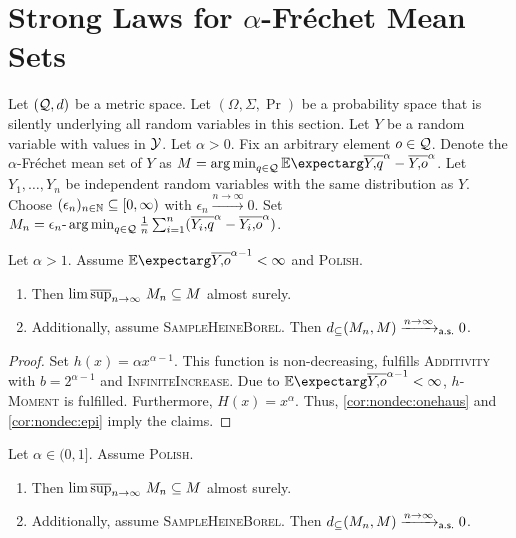 %
\section{Strong Laws for $\alpha$-Fréchet Mean Sets}\label{sec:power}
%
Let $(\mathcal{Q}, d)$ be a metric space. Let $(\Omega, \Sigma, \Pr)$ be a probability space that is silently underlying all random variables in this section. Let $Y$ be a random variable with values in $\mathcal{Y}$.
Let $\alpha > 0$. Fix an arbitrary element $o\in\mathcal{Q}$. Denote the $\alpha$-Fréchet mean set of $Y$ as $M = \argmin_{q\in\mc Q} \Ex{\ol Yq^\alpha - \ol Yo^\alpha}$.
Let $Y_1, \dots, Y_n$ be independent random variables with the same distribution as $Y$.
Choose $(\epsilon_n)_{n\in\mathbb{N}}\subseteq [0,\infty)$ with $\epsilon_n \xrightarrow{n\to\infty}0$. Set $M_n =\epsilon_n\text{-}\operatorname*{arg\,min}_{q\in\mathcal{Q}} \frac1n \sum_{i=1}^n (\overline{Y_i,\!q}^\alpha - \overline{Y_i,\!o}^\alpha)$.
%
\begin{corollary}\label{cor:cons_da}
	Let $\alpha > 1$.
	Assume $\Ex{\ol Yo^{\alpha-1}} < \infty$ and \textsc{Polish}.	
	\begin{enumerate}[label=(\roman*)]
	\item Then $\operatorname*{lim\, \overline{sup}}_{n\to\infty}\, M_n \subseteq M$ almost surely.
	\item Additionally, assume \textsc{SampleHeineBorel}.
		Then $d_\subseteq(M_n, M) \xrightarrow{n\to\infty}_{\mathsf{a.s.}} 0$.
	\end{enumerate}	
\end{corollary}
%
\begin{proof}
	Set $h(x) = \alpha x^{\alpha-1}$. This function is non-decreasing, fulfills \textsc{Additivity} with $b = 2^{\alpha-1}$ and \textsc{InfiniteIncrease}.
	Due to $\Ex{\ol Yo^{\alpha-1}} < \infty$, \textsc{$h$-Moment} is fulfilled. Furthermore, $H(x) = x^\alpha$. Thus, \autoref{cor:nondec:onehaus} and \autoref{cor:nondec:epi} imply the claims.
\end{proof}
%
\begin{corollary}\label{cor:median}
	Let $\alpha \in (0,1]$. Assume \textsc{Polish}.
	\begin{enumerate}[label=(\roman*)]
	\item Then $\operatorname*{lim\, \overline{sup}}_{n\to\infty}\, M_n \subseteq M$ almost surely.
	\item Additionally, assume \textsc{SampleHeineBorel}.
		Then $d_\subseteq(M_n, M) \xrightarrow{n\to\infty}_{\mathsf{a.s.}} 0$.
	\end{enumerate}	
\end{corollary}
%
